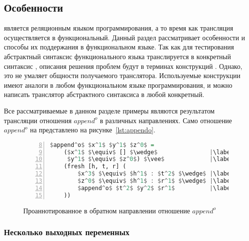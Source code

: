 \subsection{Особенности \miniKanren{}}

\miniKanren{} является реляционным языком программирования, а то время как трансляция осуществляется в функциональный.
Данный раздел рассматривает особенности \miniKanren{} и способы их поддержания в функциональном языке.
Так как для тестирования абстрактный синтаксис функционального языка транслируется в конкретный синтаксис \haskell{}, описания решения проблем будут в терминах конструкций \haskell{}.
Однако, это не умаляет общности получаемого транслятора.
Используемые конструкции имеют аналоги в любом функциональном языке программирования, и можно написать транслятор абстрактного синтаксиса в любой конкретный.

Все рассматриваемые в данном разделе примеры являются результатом трансляции отношения $append^o$ в различных направлениях.
Само отношение $append^o$ на \miniKanren{} представлено на рисунке~\ref{lst:appendo}.

\begin{figure}[h!]
  \begin{center}
  \begin{minipage}{0.4\textwidth}
  \begin{lstlisting}[language=Haskell, frame=single, numbers=left,numberstyle=\small, firstnumber=8, escapechar=|]
  $append^o$ $x^1$ $y^1$ $z^0$ =
    ($x^1$ $\equiv$ [] $\wedge$               |\label{line:appendoOOIANN2}|
     $y^1$ $\equiv$ $z^0$) $\vee$             |\label{line:appendoOOIANN3}|
    (fresh [h, t, r] (
        $x^3$ $\equiv$ $h^1$ : $t^2$ $\wedge$ |\label{line:appendoOOIANN4}|
        $z^0$ $\equiv$ $h^1$ : $r^1$ $\wedge$ |\label{line:appendoOOIANN5}|
        $append^o$ $t^2$ $y^2$ $r^1$          |\label{line:appendoOOIANN6}|
    ))
    \end{lstlisting}
  \end{minipage}
  \end{center}
  \caption{Проаннотированное в обратном направлении отношение $append^o$}
  \label{lst:appendoOOIANN}
\end{figure}


\subsubsection{Несколько выходных переменных}

